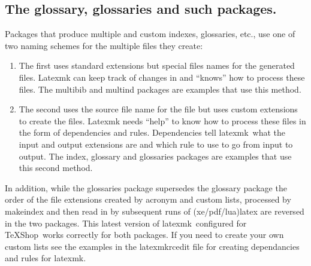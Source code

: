\documentclass[11pt]{article}
\newcommand{\cmd}[1]{\textsf{#1}}
\newcommand{\TS}{\textsf{\TeX Shop}}
\newcommand{\latexmk}{\textsf{latexmk}}
\begin{document}
%
%

\subsection{The \cmd{glossary}, \cmd{glossaries} and such packages.}

Packages that produce multiple and custom indexes, glossaries, etc., use one of two naming schemes for the multiple files they create:
\begin{enumerate}
\item
The first uses standard extensions but special files names for the generated files. \cmd{Latexmk} can keep track of changes in and ``knows'' how to process these files. The \cmd{multibib} and \cmd{multind} packages are examples that use this method.
\item
The second uses the source file name for the file but uses custom extensions to create the files. \cmd{Latexmk} needs ``help'' to know how to process these files in the form of dependencies and rules. Dependencies tell \latexmk\ what the input and output extensions are and which rule to use to go from input to output. The \cmd{index}, \cmd{glossary} and \cmd{glossaries} packages are examples that use this second method.
\end{enumerate}

In addition, while the \cmd{glossaries} package supersedes the \cmd{glossary} package the order of the file extensions created by acronym and custom lists, processed by \cmd{makeindex} and then read in by subsequent runs of \cmd{(xe/pdf/lua)latex} are reversed in the two packages. This latest version of \latexmk\ configured for \TS\ works correctly for both packages. If you need to create your own custom lists see the examples in the \cmd{latexmkrcedit} file for creating dependancies and rules for \latexmk.
\end{document}
